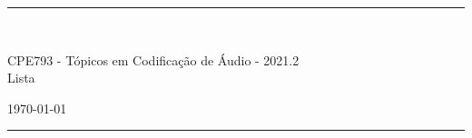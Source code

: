 \fancyhead[C]{}
\hrule \medskip
\begin{minipage}{0.295\textwidth} 
\raggedright
\footnotesize
\yourname \hfill\\ 
\end{minipage}
\begin{minipage}{0.4\textwidth} 
\centering 
\large 
CPE793 - Tópicos em Codificação de Áudio - 2021.2\\ 
\normalsize 
Lista \assignmentnumber\\ 
\end{minipage}
\begin{minipage}{0.295\textwidth} 
\raggedleft
\today\hfill\\
\end{minipage}
\medskip\hrule 
\bigskip
